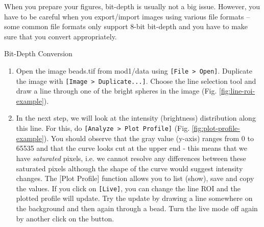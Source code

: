 When you prepare your figures, bit-depth is usually not a big issue. However, you have to be careful when you export/import images using various file formats -- some common file formats only support 8-bit bit-depth and you have to make sure that you convert appropriately.

\newpage
\begin{taskbox}{Bit-Depth Conversion}
\begin{enumerate}
	\item Open the image beads.tif from mod1/data using \texttt{[File > Open]}. Duplicate the image with \texttt{[Image > Duplicate...]}. Choose the line selection tool and draw a line through one of the bright spheres in the image (Fig. \ref{fig:line-roi-example}).	
	
	\begin{minipage}[t]{\linewidth}
		\begin{center}
		\medskip
		\label{fig:line-roi-example}
		\end{center}
	\end{minipage}
	
	\item In the next step, we will look at the intensity (brightness) distribution along this line. For this, do \texttt{[Analyze > Plot Profile]} (Fig. \ref{fig:plot-profile-example}). You should observe that the gray value (y-axis) ranges from 0 to 65535 and that the curve looks cut at the upper end - this means that we have \emph{saturated} pixels, i.e. we cannot resolve any differences between these saturated pixels although the shape of the curve would suggest intensity changes. The [Plot Profile] function allows you to list (show), save and copy the values. If you click on \texttt{[Live]}, you can change the line ROI and the plotted profile will update. Try the update by drawing a line somewhere on the background and then again through a bead. Turn the live mode off again by another click on the button. 


\end{enumerate}
\end{taskbox}

